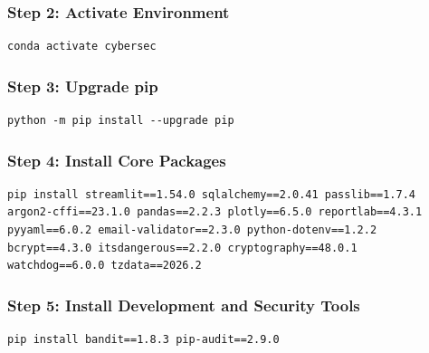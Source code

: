 \documentclass[12pt,a4paper]{article}
\begin{document}
\subsubsection{Step 2: Activate Environment}

\begin{tcolorbox}[colback=gray!10!white, colframe=gray!70!black, arc=3pt, boxrule=0.5pt]
\begin{verbatim}
conda activate cybersec
\end{verbatim}
\end{tcolorbox}

\subsubsection{Step 3: Upgrade pip}

\begin{tcolorbox}[colback=gray!10!white, colframe=gray!70!black, arc=3pt, boxrule=0.5pt]
\begin{verbatim}
python -m pip install --upgrade pip
\end{verbatim}
\end{tcolorbox}

\subsubsection{Step 4: Install Core Packages}

\begin{tcolorbox}[colback=gray!10!white, colframe=gray!70!black, arc=3pt, boxrule=0.5pt]
\begin{verbatim}
pip install streamlit==1.54.0 sqlalchemy==2.0.41 passlib==1.7.4 
argon2-cffi==23.1.0 pandas==2.2.3 plotly==6.5.0 reportlab==4.3.1 
pyyaml==6.0.2 email-validator==2.3.0 python-dotenv==1.2.2 
bcrypt==4.3.0 itsdangerous==2.2.0 cryptography==48.0.1
watchdog==6.0.0 tzdata==2026.2
\end{verbatim}
\end{tcolorbox}


\subsubsection{Step 5: Install Development and Security Tools}

\begin{tcolorbox}[colback=gray!10!white, colframe=gray!70!black, arc=3pt, boxrule=0.5pt]
\begin{verbatim}
pip install bandit==1.8.3 pip-audit==2.9.0
\end{verbatim}
\end{tcolorbox}
\end{document}
